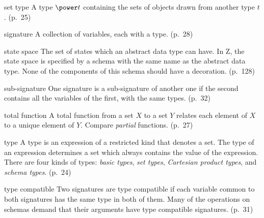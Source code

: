 \begin{theglossary}
\item[set type] A type $\power t$ containing the sets of objects drawn
  from another type $t$. (p.~25)
\item[signature] A collection of variables, each with a type. (p.~28)
\item[state space] The set of states which an abstract data type can
  have. In Z, the state space is specified by a schema with the same
  name as the abstract data type. None of the components of this schema
  should have a decoration. (p.~128)
\item[sub-signature] One signature is a sub-signature of another one if
  the second contains all the variables of the first, with the same
  types. (p.~32)
\item[total function] A total function from a set $X$ to a set $Y$
  relates each element of $X$ to a unique element of $Y$. Compare {\em
  partial\/} functions. (p.~27)
\item[type] A type is an expression of a restricted kind that denotes a
  set. The type of an expression determines a set which always contains
  the value of the expression. There are four kinds of types: {\em basic
  types}, {\em set types}, {\em Cartesian product types}, and {\em
  schema types}. (p.~24)
\item[type compatible] Two signatures are type compatible if each
  variable common to both signatures has the same type in both of them.
  Many of the operations on schemas demand that their arguments have
  type compatible signatures. (p.~31)
\end{theglossary}

